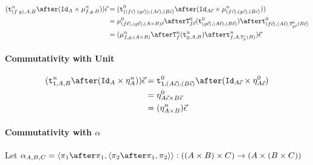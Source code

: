 \documentclass{report}
\newcommand{\Tz}[2]{\texttt{T}^0_{#1}#2}
\newcommand{\Tn}[2]{\texttt{T}^n_{#1}#2}
\newcommand{\pointz}[1]{\point{#1}^0}
\newcommand{\pointn}[1]{\point{#1}^n}
\newcommand{\bindz}[3]{\bind{#1}{#2}{#3}^0}
\newcommand{\bindn}[3]{\bind{#1}{#2}{#3}^n}
\newcommand\tstrengthz[3]{\tstrength{#1}{#2}{#3}^0}
\newcommand\tstrengthn[3]{\tstrength{#1}{#2}{#3}^n}
\newcommand\ev[0]{\vec{\e}}
\begin{document}
\begin{align}
    (\tstrengthn{(f\dot g)}{A}{B}\after (\Id{A}\times \bindn{f}{g}{B}))\ev & = (\tstrengthz{((f\ev)\dot (g\ev))}{(A\ev)}{(B\ev)}\after (\Id{A\ev}\times \bindn{(f\ev)}{(g\ev)}{(B\ev)}))\\
    & = \bindz{(f\ev)}{(g\ev)}{(A\times B)\ev}\after\Tz{f\ev}{(\tstrengthz{(g\ev)}{(A\ev)}{(B\ev)})}\after\tstrengthz{(f\ev)}{(A\ev)}{\Tz{g\ev}{(B\ev)}}\\
    & = (\bindn{f}{g}{(A\times B)}\after\Tn{f}{(\tstrengthn{g}{A}{B})}\after\tstrengthn{f}{A}{\Tn{g}{(B)}})\ev
\end{align}



\paragraph{Commutativity with Unit}


\begin{align}
    (\tstrengthn{\1}{A}{B}\after(\Id{A}\times \pointn{A}))\ev & = \tstrengthz{\1}{(A\ev)}{(B\ev)}\after(\Id{A\ev}\times \pointz{A\ev})\\
    & = \pointz{A\ev\times B\ev}\\
    & = (\pointn{A\times B})\ev
\end{align}

\paragraph{Commutativity with $\alpha$}
Let $\alpha_{A, B, C} = \pr{\p\after\p}{\pr{\pp\after\p}{\pp}}: ((A \times B) \times C) \rightarrow (A \times (B \times C))$


\end{document}

